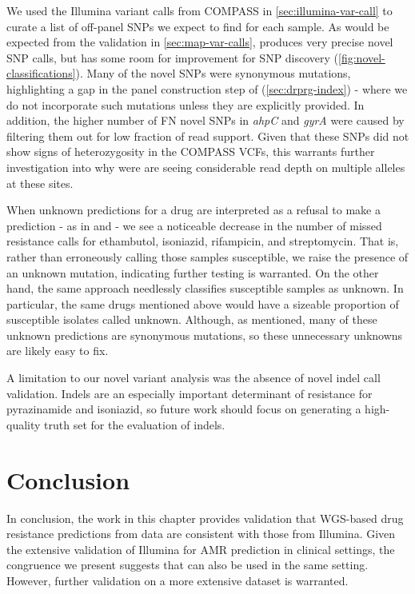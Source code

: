 We used the Illumina variant calls from COMPASS in \autoref{sec:illumina-var-call} to curate a list of off-panel SNPs we expect to find for each sample. As would be expected from the \pandora{} validation in \autoref{sec:map-var-calls}, \drprg{} produces very precise novel SNP calls, but has some room for improvement for SNP discovery (\autoref{fig:novel-classifications}). Many of the novel SNPs were synonymous mutations, highlighting a gap in the panel construction step of \drprg{} (\autoref{sec:drprg-index}) - where we do not incorporate such mutations unless they are explicitly provided. In addition, the higher number of FN novel SNPs in \textit{ahpC} and \textit{gyrA} were caused by \drprg{} filtering them out for low fraction of read support. Given that these SNPs did not show signs of heterozygosity in the COMPASS VCFs, this warrants further investigation into why were are seeing considerable read depth on multiple alleles at these sites.

When unknown predictions for a drug are interpreted as a refusal to make a prediction - as in \cite{cryptic2018} and \cite{hunt2019} - we see a noticeable decrease in the number of missed resistance calls for ethambutol, isoniazid, rifampicin, and streptomycin. That is, rather than erroneously calling those samples susceptible, we raise the presence of an unknown mutation, indicating further testing is warranted. On the other hand, the same approach needlessly classifies susceptible samples as unknown. In particular, the same drugs mentioned above would have a sizeable proportion of susceptible isolates called unknown. Although, as mentioned, many of these unknown predictions are synonymous mutations, so these unnecessary unknowns are likely easy to fix.

A limitation to our novel variant analysis was the absence of novel indel call validation. Indels are an especially important determinant of resistance for pyrazinamide and isoniazid, so future work should focus on generating a high-quality truth set for the evaluation of \drprg{} indels.

\section{Conclusion}
In conclusion, the work in this chapter provides validation that WGS-based drug resistance predictions from \ont{} data are consistent with those from Illumina. Given the extensive validation of Illumina for \mtb{} AMR prediction in clinical settings, the congruence we present suggests that \ont{} can also be used in the same setting. However, further validation on a more extensive dataset is warranted. 

